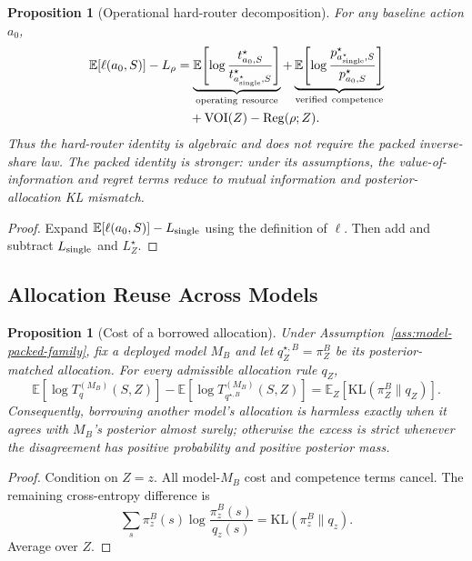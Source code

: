 \documentclass[10pt]{article}
\theoremstyle{paperplain}
\newtheorem{proposition}[theorem]{Proposition}
\theoremstyle{paperdefinition}
\theoremstyle{paperremark}
\newcommand{\KL}{\mathrm{KL}}
\newcommand{\E}{\mathbb{E}}
\begin{document}
\begin{proposition}[Operational hard-router decomposition]
\label{prop:operational-hard-router}
For any baseline action \(a_0\),
\[
\begin{aligned}
  \E[\ell(a_0,S)]-L_\rho
  &=
  \underbrace{\E\!\left[
    \log\frac{t^\star_{a_0,S}}
             {t^\star_{a^\star_{\rm single},S}}
  \right]}_{\rm operating\ resource}
  +
  \underbrace{\E\!\left[
    \log\frac{p^\star_{a^\star_{\rm single},S}}
             {p^\star_{a_0,S}}
  \right]}_{\rm verified\ competence}
  \\
  &\quad+
  \operatorname{VOI}(Z)-\operatorname{Reg}(\rho;Z).
\end{aligned}
\]
Thus the hard-router identity is algebraic and does not require the packed
inverse-share law.  The packed identity is stronger: under its assumptions,
the value-of-information and regret terms reduce to mutual information and
posterior-allocation KL mismatch.
\end{proposition}

\begin{proof}
Expand
\(\E[\ell(a_0,S)]-L_{\rm single}\) using the definition of \(\ell\).
Then add and subtract \(L_{\rm single}\) and \(L_Z^\star\).
\end{proof}

\subsection{Allocation Reuse Across Models}

\begin{proposition}[Cost of a borrowed allocation]
\label{prop:borrowed-allocation-consolidated}
Under Assumption~\ref{ass:model-packed-family}, fix a deployed model \(M_B\)
and let \(q_Z^{\star,B}=\pi_Z^B\) be its posterior-matched allocation.
For every admissible allocation rule \(q_Z\),
\[
  \E[\log T_q^{(M_B)}(S,Z)]
  -
  \E[\log T_{q^{\star,B}}^{(M_B)}(S,Z)]
  =
  \E_Z\!\left[\KL(\pi_Z^B\|q_Z)\right].
\]
Consequently, borrowing another model's allocation is harmless exactly when
it agrees with \(M_B\)'s posterior almost surely; otherwise the excess is
strict whenever the disagreement has positive probability and positive
posterior mass.
\end{proposition}

\begin{proof}
Condition on \(Z=z\).  All model-\(M_B\) cost and competence terms cancel.
The remaining cross-entropy difference is
\[
  \sum_s\pi_z^B(s)\log\frac{\pi_z^B(s)}{q_z(s)}
  =\KL(\pi_z^B\|q_z).
\]
Average over \(Z\).
\end{proof}
\end{document}
